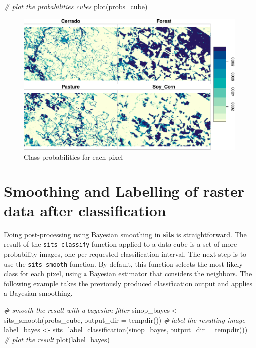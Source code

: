 \documentclass[a4paper,]{tufte-book}
\newenvironment{Shaded}{}{}
\newcommand{\AttributeTok}[1]{\textcolor[rgb]{0.49,0.56,0.16}{#1}}
\newcommand{\CommentTok}[1]{\textcolor[rgb]{0.38,0.63,0.69}{\textit{#1}}}
\newcommand{\FunctionTok}[1]{\textcolor[rgb]{0.02,0.16,0.49}{#1}}
\newcommand{\NormalTok}[1]{#1}
\newcommand{\OtherTok}[1]{\textcolor[rgb]{0.00,0.44,0.13}{#1}}
\begin{document}
\begin{Shaded}
\begin{Highlighting}[]
\CommentTok{\# plot the probabilities cubes}
\FunctionTok{plot}\NormalTok{(probs\_cube)}
\end{Highlighting}
\end{Shaded}

\begin{figure}

{\centering \includegraphics[width=0.7\linewidth]{sitsbook_files/figure-latex/unnamed-chunk-14-1} 

}

\caption[Class probabilities for each pixel]{Class probabilities for each pixel}\label{fig:unnamed-chunk-14}
\end{figure}

\hypertarget{smoothing-and-labelling-of-raster-data-after-classification}{%
\section{Smoothing and Labelling of raster data after classification}\label{smoothing-and-labelling-of-raster-data-after-classification}}

Doing post-processing using Bayesian smoothing in \textbf{sits} is straightforward. The result of the \texttt{sits\_classify} function applied to a data cube is a set of more probability images, one per requested classification interval. The next step is to use the \texttt{sits\_smooth} function. By default, this function selects the most likely class for each pixel, using a Bayesian estimator that considers the neighbors. The following example takes the previously produced classification output and applies a Bayesian smoothing.

\begin{Shaded}
\begin{Highlighting}[]
\CommentTok{\# smooth the result with a bayesian filter}
\NormalTok{sinop\_bayes }\OtherTok{\textless{}{-}} \FunctionTok{sits\_smooth}\NormalTok{(probs\_cube, }\AttributeTok{output\_dir =} \FunctionTok{tempdir}\NormalTok{())}
\CommentTok{\# label the resulting image}
\NormalTok{label\_bayes }\OtherTok{\textless{}{-}} \FunctionTok{sits\_label\_classification}\NormalTok{(sinop\_bayes, }\AttributeTok{output\_dir =} \FunctionTok{tempdir}\NormalTok{())}
\CommentTok{\# plot the result}
\FunctionTok{plot}\NormalTok{(label\_bayes)}
\end{Highlighting}
\end{Shaded}
\end{document}
